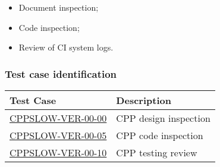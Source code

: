 \begin{itemize}

  \item{Document inspection;}
  \item{Code inspection;}
  \item{Review of CI system logs.}

\end{itemize}

\subsubsection{Test case identification}
\phantom{ } %
\begin{longtable} {|p{}|p{}|}\hline
\textbf{Test Case}  & \textbf{Description} \\\hline
\hyperref[cppslow-ver-00-00]{CPPSLOW-VER-00-00} & CPP design inspection \\\hline
\hyperref[cppslow-ver-00-05]{CPPSLOW-VER-00-05} & CPP code inspection \\\hline
\hyperref[cppslow-ver-00-10]{CPPSLOW-VER-00-10} & CPP testing review \\\hline
\end{longtable}
